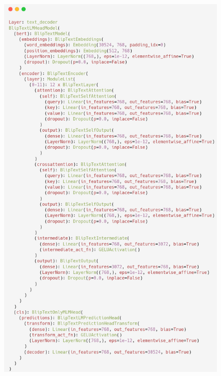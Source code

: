 \begin{figure}[H]
  \centering
  \includegraphics[width=\textwidth, height = 21cm]{image/lampiran/blip-text-decoder.png}
  \label{fig:layer-text-decoder-blip}
\end{figure}



